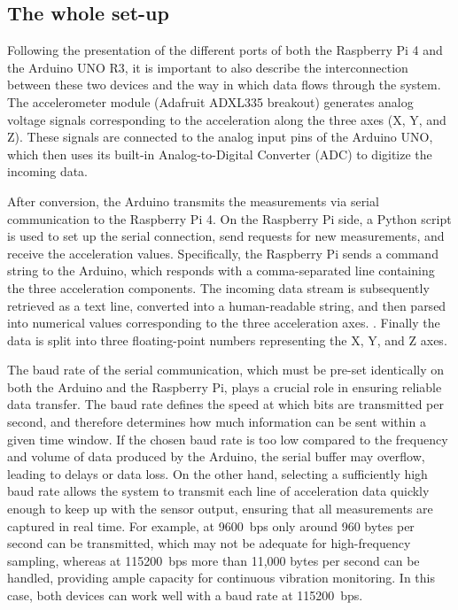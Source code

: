 \subsection{The whole set-up} 
{
	Following the presentation of the different ports of both the Raspberry Pi 4 and the Arduino UNO R3, it is important to also describe the interconnection between these two devices and the way in which data flows through the system. The accelerometer module (Adafruit ADXL335 breakout) generates analog voltage signals corresponding to the acceleration along the three axes (X, Y, and Z). These signals are connected to the analog input pins of the Arduino UNO, which then uses its built-in Analog-to-Digital Converter (ADC) to digitize the incoming data. 
	
	After conversion, the Arduino transmits the measurements via serial communication to the Raspberry Pi 4. On the Raspberry Pi side, a Python script is used to set up the serial connection, send requests for new measurements, and receive the acceleration values. Specifically, the Raspberry Pi sends a command string to the Arduino, which responds with a comma-separated line containing the three acceleration components. The incoming data stream is subsequently retrieved as a text line, converted into a human-readable string, and then parsed into numerical values corresponding to the three acceleration axes.
	. Finally the data is split into three floating-point numbers representing the X, Y, and Z axes.
	
	The baud rate of the serial communication, which must be pre-set identically on both the Arduino and the Raspberry Pi, plays a crucial role in ensuring reliable data transfer. The baud rate defines the speed at which bits are transmitted per second, and therefore determines how much information can be sent within a given time window. If the chosen baud rate is too low compared to the frequency and volume of data produced by the Arduino, the serial buffer may overflow, leading to delays or data loss. On the other hand, selecting a sufficiently high baud rate allows the system to transmit each line of acceleration data quickly enough to keep up with the sensor output, ensuring that all measurements are captured in real time. For example, at 9600~bps only around 960 bytes per second can be transmitted, which may not be adequate for high-frequency sampling, whereas at 115200~bps more than 11,000 bytes per second can be handled, providing ample capacity for continuous vibration monitoring. In this case, both devices can work well with a baud rate at 115200~bps.
	
}
